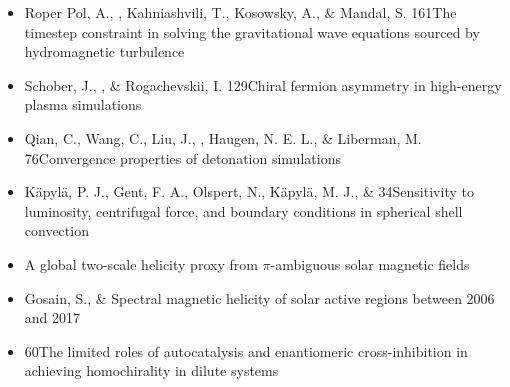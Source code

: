 \begin{itemize}
\item[{394.}~]
Roper Pol, A., \Brandenburg, Kahniashvili, T., Kosowsky, A., \& Mandal, S.
{161}{The timestep constraint in solving the gravitational wave equations sourced by hydromagnetic turbulence}

\item[{393.}~]
Schober, J., \Brandenburg, \& Rogachevskii, I.
{129}{Chiral fermion asymmetry in high-energy plasma simulations}

\item[{392.}~]
Qian, C., Wang, C., Liu, J., \Brandenburg, Haugen, N. E. L., \& Liberman, M.
{76}{Convergence properties of detonation simulations}

\item[{391.}~]
K\"apyl\"a, P. J., Gent, F. A., Olspert, N., K\"apyl\"a, M. J., \& \Brandenburg{}
{34}{Sensitivity to luminosity, centrifugal force, and boundary conditions in spherical shell convection}

\item[{390.}~]
\Brandenburg{}
{A global two-scale helicity proxy from $\pi$-ambiguous solar magnetic fields}

\item[{389.}~]
Gosain, S., \& \Brandenburg{}
{Spectral magnetic helicity of solar active regions between 2006 and 2017}

\item[{388.}~]
\Brandenburg{}
{60}{The limited roles of autocatalysis and enantiomeric cross-inhibition in achieving homochirality in dilute systems}


\end{itemize}
